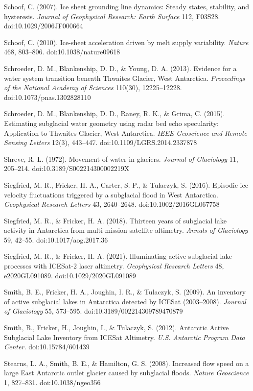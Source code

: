 \documentclass[11pt]{article}
\begin{document}
Schoof, C. (2007). Ice sheet grounding line dynamics: Steady states, stability, and hysteresis. \emph{Journal of Geophysical Research: Earth Surface} 112, F03S28. doi:10.1029/2006JF000664


Schoof, C. (2010). Ice-sheet acceleration driven by melt supply variability. \emph{Nature} 468, 803–806. doi:10.1038/nature09618


Schroeder, D. M., Blankenship, D. D., \& Young, D. A. (2013). Evidence for a water system transition beneath Thwaites Glacier, West Antarctica. \emph{Proceedings of the National Academy of Sciences} 110(30), 12225–12228. doi:10.1073/pnas.1302828110


Schroeder, D. M., Blankenship, D. D., Raney, R. K., \& Grima, C. (2015). Estimating subglacial water geometry using radar bed echo specularity: Application to Thwaites Glacier, West Antarctica. \emph{IEEE Geoscience and Remote Sensing Letters} 12(3), 443–447. doi:10.1109/LGRS.2014.2337878


Shreve, R. L. (1972). Movement of water in glaciers. \emph{Journal of Glaciology} 11, 205–214. doi:10.3189/S002214300002219X


Siegfried, M. R., Fricker, H. A., Carter, S. P., \& Tulaczyk, S. (2016). Episodic ice velocity fluctuations triggered by a subglacial flood in West Antarctica. \emph{Geophysical Research Letters} 43, 2640–2648. doi:10.1002/2016GL067758


Siegfried, M. R., \& Fricker, H. A. (2018). Thirteen years of subglacial lake activity in Antarctica from multi-mission satellite altimetry. \emph{Annals of Glaciology} 59, 42–55. doi:10.1017/aog.2017.36


Siegfried, M. R., \& Fricker, H. A. (2021). Illuminating active subglacial lake processes with ICESat-2 laser altimetry. \emph{Geophysical Research Letters} 48, e2020GL091089. doi:10.1029/2020GL091089


Smith, B. E., Fricker, H. A., Joughin, I. R., \& Tulaczyk, S. (2009). An inventory of active subglacial lakes in Antarctica detected by ICESat (2003–2008). \emph{Journal of Glaciology} 55, 573–595. doi:10.3189/002214309789470879


Smith, B., Fricker, H., Joughin, I., \& Tulaczyk, S. (2012). Antarctic Active Subglacial Lake Inventory from ICESat Altimetry. \emph{U.S. Antarctic Program Data Center.} doi:10.15784/601439


Stearns, L. A., Smith, B. E., \& Hamilton, G. S. (2008). Increased flow speed on a large East Antarctic outlet glacier caused by subglacial floods. \emph{Nature Geoscience} 1, 827–831. doi:10.1038/ngeo356
\end{document}
